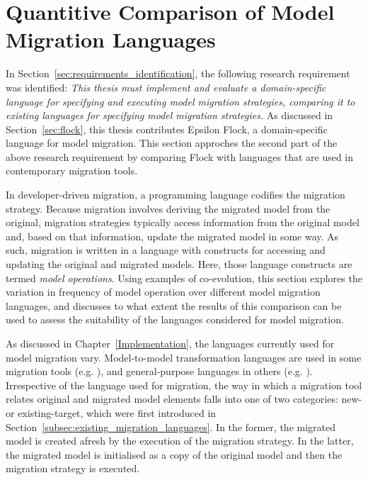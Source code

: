 
\section{Quantitive Comparison of Model Migration Languages}
\label{sec:quantitive}
In Section~\ref{sec:requirements_identification}, the following research requirement was identified: \emph{This thesis must implement and evaluate a domain-specific language for specifying and executing model migration strategies, comparing it to existing languages for specifying model migration strategies.} As discussed in Section~\ref{sec:flock}, this thesis contributes Epsilon Flock, a domain-specific language for model migration. This section approches the second part of the above research requirement by comparing Flock with languages that are used in contemporary migration tools. 

In developer-driven migration, a programming language codifies the migration strategy. Because migration involves deriving the migrated model from the original, migration strategies typically access information from the original model and, based on that information, update the migrated model in some way. As such, migration is written in a language with constructs for accessing and updating the original and migrated models. Here, those language constructs are termed \textit{model operations}. Using examples of co-evolution, this section explores the variation in frequency of model operation over different model migration languages, and discusses to what extent the results of this comparison can be used to assess the suitability of the languages considered for model migration.

As discussed in Chapter~\ref{Implementation}, the languages currently used for model migration vary. Model-to-model transformation languages are used in some migration tools (e.g. \cite{cicchetti08automating,garces09managing}), and general-purpose languages in others (e.g. \cite{herrmannsdoerfer09cope,hussey06advanced}). Irrespective of the language used for migration, the way in which a migration tool relates original and migrated model elements falls into one of two categories: new- or existing-target, which were first introduced in Section~\ref{subsec:existing_migration_languages}. In the former, the migrated model is created afresh by the execution of the migration strategy. In the latter, the migrated model is initialised as a copy of the original model and then the migration strategy is executed.

